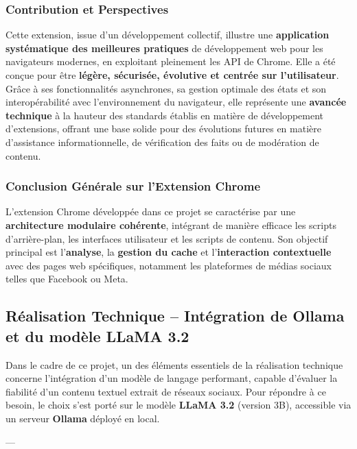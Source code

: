 \begin{description}
\subsubsection*{Contribution et Perspectives}
Cette extension, issue d'un développement collectif, illustre une \textbf{application systématique des meilleures pratiques} de développement web pour les navigateurs modernes, en exploitant pleinement les API de Chrome. Elle a été conçue pour être \textbf{légère, sécurisée, évolutive et centrée sur l'utilisateur}. Grâce à ses fonctionnalités asynchrones, sa gestion optimale des états et son interopérabilité avec l'environnement du navigateur, elle représente une \textbf{avancée technique} à la hauteur des standards établis en matière de développement d'extensions, offrant une base solide pour des évolutions futures en matière d'assistance informationnelle, de vérification des faits ou de modération de contenu.

\subsubsection{Conclusion Générale sur l'Extension Chrome}

L'extension Chrome développée dans ce projet se caractérise par une \textbf{architecture modulaire cohérente}, intégrant de manière efficace les scripts d'arrière-plan, les interfaces utilisateur et les scripts de contenu. Son objectif principal est l'\textbf{analyse}, la \textbf{gestion du cache} et l'\textbf{interaction contextuelle} avec des pages web spécifiques, notamment les plateformes de médias sociaux telles que Facebook ou Meta.
\subsection{Réalisation Technique – Intégration de Ollama et du modèle LLaMA 3.2}

Dans le cadre de ce projet, un des éléments essentiels de la réalisation technique concerne l'intégration d'un modèle de langage performant, capable d'évaluer la fiabilité d'un contenu textuel extrait de réseaux sociaux. Pour répondre à ce besoin, le choix s'est porté sur le modèle \textbf{LLaMA 3.2} (version 3B), accessible via un serveur \textbf{Ollama} déployé en local.

---


\end{description}
